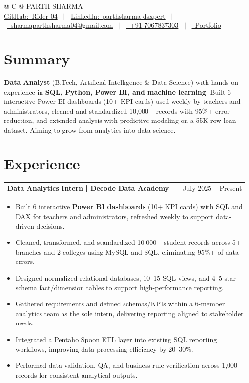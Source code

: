 \documentclass[a4paper,10pt]{article}
\makeatletter
\newcommand{\faGithub}{GitHub:}\newcommand{\faLinkedin}{LinkedIn:}\newcommand{\faEnvelope}{}%
\newcommand{\faMobile}{}\newcommand{\faGlobe}{}}
\newenvironment{joblong}[2]
    {
    \begin{tabularx}{\linewidth}{@{}l X r@{}}
    \textbf{#1} & \hfill &  #2 \\[2pt]
    \end{tabularx}
    \begin{minipage}[t]{\linewidth}
    \begin{itemize}[nosep,after=\strut, leftmargin=1em, itemsep=1pt,label=--]
    }
    {
    \end{itemize}
    \end{minipage}
    }
\makeatother
\begin{document}
\pagestyle{empty}

\begin{tabularx}{\linewidth}{@{} C @{}}
\Huge{PARTH SHARMA} \\[5pt]
\href{https://github.com/Rider-04}{\raisebox{-0.05\height}\faGithub\ Rider-04} \ $|$ \
\href{https://www.linkedin.com/in/parthsharma-dsxpert}{\raisebox{-0.05\height}\faLinkedin\ parthsharma-dsxpert} \ $|$ \
\href{mailto:sharmaparthsharma04@gmail.com}{\raisebox{-0.05\height}\faEnvelope \ sharmaparthsharma04@gmail.com} \ $|$ \
\href{tel:+917067837303}{\raisebox{-0.05\height}\faMobile \ +91-7067837303} \ $|$ \
\href{https://parth-portfolio-virid.vercel.app/}{\raisebox{-0.05\height}\faGlobe \ Portfolio}
\end{tabularx}

\section{Summary}
\textbf{Data Analyst} (B.Tech, Artificial Intelligence \& Data Science) with hands-on experience in \textbf{SQL, Python, Power BI, and machine learning}. Built 6 interactive Power BI dashboards (10+ KPI cards) used weekly by teachers and administrators, cleaned and standardized 10,000+ records with 95\%+ error reduction, and extended analysis with predictive modeling on a 55K-row loan dataset. Aiming to grow from analytics into data science.

\section{Experience}
\begin{joblong}{Data Analytics Intern | Decode Data Academy}{July 2025 -- Present}
\item Built 6 interactive \textbf{Power BI dashboards} (10+ KPI cards) with SQL and DAX for teachers and administrators, refreshed weekly to support data-driven decisions.
\item Cleaned, transformed, and standardized 10,000+ student records across 5+ branches and 2 colleges using MySQL and SQL, eliminating 95\%+ of data errors.
\item Designed normalized relational databases, 10--15 SQL views, and 4--5 star-schema fact/dimension tables to support high-performance reporting.
\item Gathered requirements and defined schemas/KPIs within a 6-member analytics team as the sole intern, delivering reporting aligned to stakeholder needs.
\item Integrated a Pentaho Spoon ETL layer into existing SQL reporting workflows, improving data-processing efficiency by 20--30\%.
\item Performed data validation, QA, and business-rule verification across 1,000+ records for consistent analytical outputs.
\end{joblong}
\end{document}
